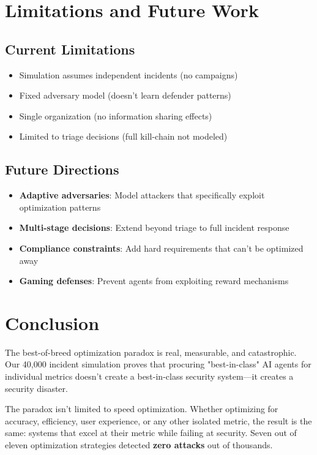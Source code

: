 \documentclass[11pt]{article}
\begin{document}
\section{Limitations and Future Work}

\subsection{Current Limitations}
\begin{itemize}
\item Simulation assumes independent incidents (no campaigns)
\item Fixed adversary model (doesn't learn defender patterns)
\item Single organization (no information sharing effects)
\item Limited to triage decisions (full kill-chain not modeled)
\end{itemize}

\subsection{Future Directions}
\begin{itemize}
\item \textbf{Adaptive adversaries}: Model attackers that specifically exploit optimization patterns
\item \textbf{Multi-stage decisions}: Extend beyond triage to full incident response
\item \textbf{Compliance constraints}: Add hard requirements that can't be optimized away
\item \textbf{Gaming defenses}: Prevent agents from exploiting reward mechanisms
\end{itemize}

\section{Conclusion}

The best-of-breed optimization paradox is real, measurable, and catastrophic. Our 40,000 incident simulation proves that procuring "best-in-class" AI agents for individual metrics doesn't create a best-in-class security system—it creates a security disaster.

The paradox isn't limited to speed optimization. Whether optimizing for accuracy, efficiency, user experience, or any other isolated metric, the result is the same: systems that excel at their metric while failing at security. Seven out of eleven optimization strategies detected \textbf{zero attacks} out of thousands.
\end{document}
